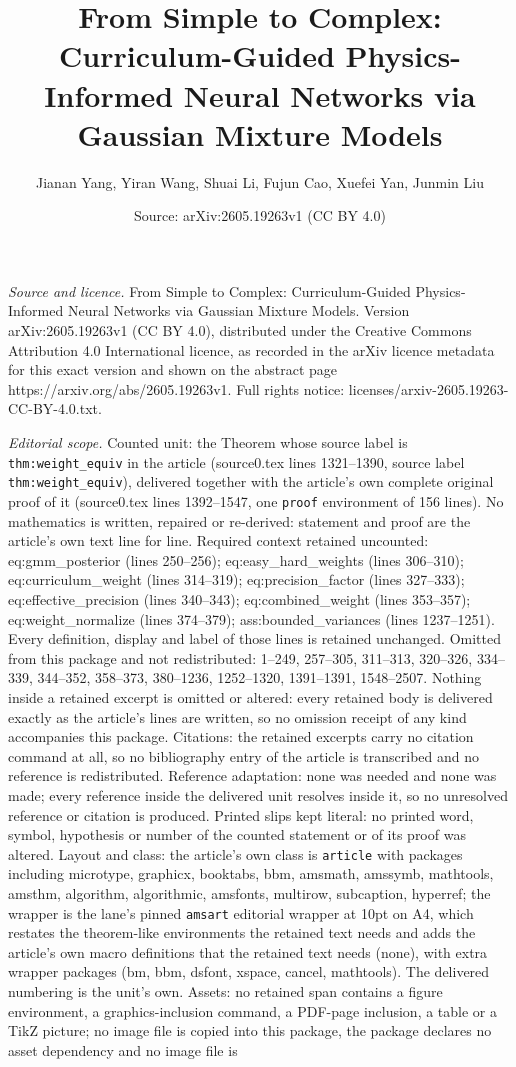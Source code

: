 \documentclass[10pt,a4paper]{amsart}
\title[From Simple to Complex: Curriculum-Guided Physics-Informed N]{From Simple to Complex: Curriculum-Guided Physics-Informed Neural Networks via Gaussian Mixture Models}
\author{Jianan Yang, Yiran Wang, Shuai Li, Fujun Cao, Xuefei Yan, Junmin Liu}
\date{Source: arXiv:2605.19263v1 (CC BY 4.0)}
\begin{document}
\maketitle

\noindent\emph{Source and licence.} From Simple to Complex: Curriculum-Guided Physics-Informed Neural Networks via Gaussian Mixture Models. Version arXiv:2605.19263v1 (CC BY 4.0), distributed under the Creative Commons Attribution 4.0 International licence, as recorded in the arXiv licence metadata for this exact version and shown on the abstract page https://arxiv.org/abs/2605.19263v1. Full rights notice: licenses/arxiv-2605.19263-CC-BY-4.0.txt.\par\smallskip

\noindent\textit{Editorial scope.} Counted unit: the Theorem whose source label is \texttt{thm:weight\_equiv} in the article (source0.tex lines 1321--1390, source label \texttt{thm:weight\_equiv}), delivered together with the article's own complete original proof of it (source0.tex lines 1392--1547, one \texttt{proof} environment of 156 lines). No mathematics is written, repaired or re-derived: statement and proof are the article's own text line for line. Required context retained uncounted: eq:gmm\_posterior (lines 250--256); eq:easy\_hard\_weights (lines 306--310); eq:curriculum\_weight (lines 314--319); eq:precision\_factor (lines 327--333); eq:effective\_precision (lines 340--343); eq:combined\_weight (lines 353--357); eq:weight\_normalize (lines 374--379); ass:bounded\_variances (lines 1237--1251). Every definition, display and label of those lines is retained unchanged. Omitted from this package and not redistributed: 1--249, 257--305, 311--313, 320--326, 334--339, 344--352, 358--373, 380--1236, 1252--1320, 1391--1391, 1548--2507. Nothing inside a retained excerpt is omitted or altered: every retained body is delivered exactly as the article's lines are written, so no omission receipt of any kind accompanies this package. Citations: the retained excerpts carry no citation command at all, so no bibliography entry of the article is transcribed and no reference is redistributed. Reference adaptation: none was needed and none was made; every reference inside the delivered unit resolves inside it, so no unresolved reference or citation is produced. Printed slips kept literal: no printed word, symbol, hypothesis or number of the counted statement or of its proof was altered. Layout and class: the article's own class is \texttt{article} with packages including microtype, graphicx, booktabs, bbm, amsmath, amssymb, mathtools, amsthm, algorithm, algorithmic, amsfonts, multirow, subcaption, hyperref; the wrapper is the lane's pinned \texttt{amsart} editorial wrapper at 10pt on A4, which restates the theorem-like environments the retained text needs and adds the article's own macro definitions that the retained text needs (none), with extra wrapper packages (bm, bbm, dsfont, xspace, cancel, mathtools). The delivered numbering is the unit's own. Assets: no retained span contains a figure environment, a graphics-inclusion command, a PDF-page inclusion, a table or a TikZ picture; no image file is copied into this package, the package declares no asset dependency and no image file is 
\end{document}
